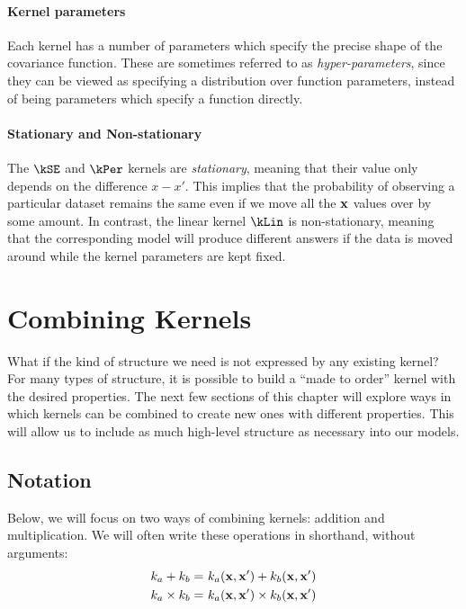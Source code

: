 \paragraph{Kernel parameters}
Each kernel has a number of parameters which specify the precise shape of the covariance function.
These are sometimes referred to as \emph{hyper-parameters}, since they can be viewed as specifying a distribution over function parameters, instead of being parameters which specify a function directly.


\paragraph{Stationary and Non-stationary}
The $\kSE$ and $\kPer$ kernels are \emph{stationary}, meaning that their value only depends on the difference $x-x'$.  This implies that the probability of observing a particular dataset remains the same even if we move all the ${\bf{x}}$ values over by some amount.
In contrast, the linear kernel $\kLin$ is non-stationary, meaning that the corresponding \gp{} model will produce different answers if the data is moved around while the kernel parameters are kept fixed.




\section{Combining Kernels}

What if the kind of structure we need is not expressed by any existing kernel?
For many types of structure, it is possible to build a ``made to order'' kernel with the desired properties.
The next few sections of this chapter will explore ways in which kernels can be combined to create new ones with different properties.
This will allow us to include as much high-level structure as necessary into our models.


\subsection{Notation}

Below, we will focus on two ways of combining kernels: addition and multiplication.
We will often write these operations in shorthand, without arguments:
%
\begin{align}
k_a + k_b =& \,\, k_a({\bf{x}}, {\bf{x}}') + k_b( {\bf{x}}, {\bf{x}}')\\
k_a \times k_b =& \,\, k_a({\bf{x}}, {\bf{x}}') \times k_b({\bf{x}}, {\bf{x}}')
\end{align}


